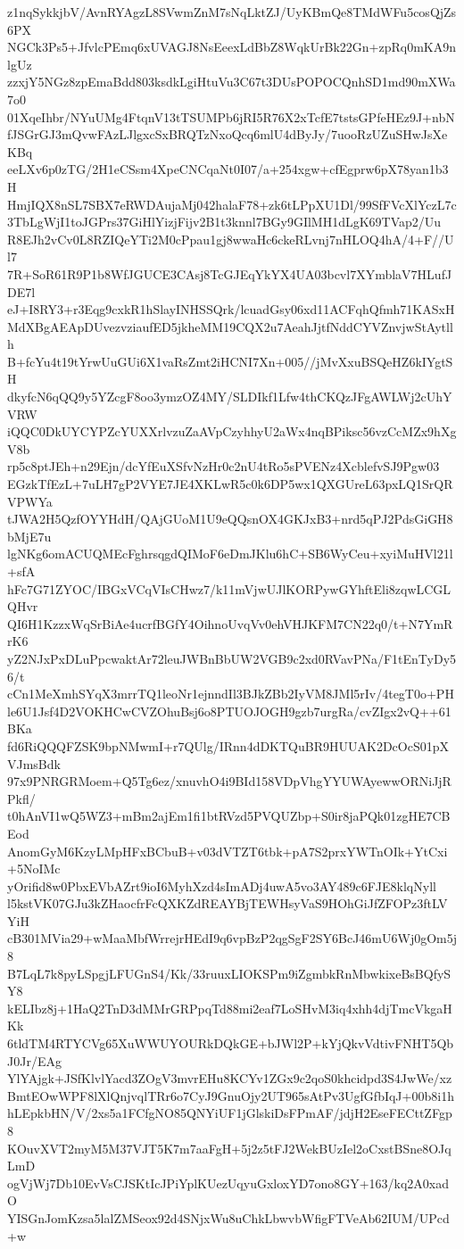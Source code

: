 z1nqSykkjbV/AvnRYAgzL8SVwmZnM7sNqLktZJ/UyKBmQe8TMdWFu5cosQjZs6PX
NGCk3Ps5+JfvlcPEmq6xUVAGJ8NsEeexLdBbZ8WqkUrBk22Gn+zpRq0mKA9nlgUz
zzxjY5NGz8zpEmaBdd803ksdkLgiHtuVu3C67t3DUsPOPOCQnhSD1md90mXWa7o0
01XqeIhbr/NYuUMg4FtqnV13tTSUMPb6jRI5R76X2xTcfE7tstsGPfeHEz9J+nbN
fJSGrGJ3mQvwFAzLJlgxcSxBRQTzNxoQcq6mlU4dByJy/7uooRzUZuSHwJsXeKBq
eeLXv6p0zTG/2H1eCSsm4XpeCNCqaNt0I07/a+254xgw+cfEgprw6pX78yan1b3H
HmjIQX8nSL7SBX7eRWDAujaMj042halaF78+zk6tLPpXU1Dl/99SfFVcXlYczL7c
3TbLgWjI1toJGPrs37GiHlYizjFijv2B1t3knnl7BGy9GIlMH1dLgK69TVap2/Uu
R8EJh2vCv0L8RZIQeYTi2M0cPpau1gj8wwaHc6ckeRLvnj7nHLOQ4hA/4+F//Ul7
7R+SoR61R9P1b8WfJGUCE3CAsj8TcGJEqYkYX4UA03bcvl7XYmblaV7HLufJDE7l
eJ+I8RY3+r3Eqg9cxkR1hSlayINHSSQrk/lcuadGsy06xd11ACFqhQfmh71KASxH
MdXBgAEApDUvezvziaufED5jkheMM19CQX2u7AeahJjtfNddCYVZnvjwStAytllh
B+fcYu4t19tYrwUuGUi6X1vaRsZmt2iHCNI7Xn+005//jMvXxuBSQeHZ6kIYgtSH
dkyfcN6qQQ9y5YZcgF8oo3ymzOZ4MY/SLDIkf1Lfw4thCKQzJFgAWLWj2cUhYVRW
iQQC0DkUYCYPZcYUXXrlvzuZaAVpCzyhhyU2aWx4nqBPiksc56vzCcMZx9hXgV8b
rp5c8ptJEh+n29Ejn/dcYfEuXSfvNzHr0c2nU4tRo5sPVENz4XcblefvSJ9Pgw03
EGzkTfEzL+7uLH7gP2VYE7JE4XKLwR5c0k6DP5wx1QXGUreL63pxLQ1SrQRVPWYa
tJWA2H5QzfOYYHdH/QAjGUoM1U9eQQsnOX4GKJxB3+nrd5qPJ2PdsGiGH8bMjE7u
lgNKg6omACUQMEcFghrsqgdQIMoF6eDmJKlu6hC+SB6WyCeu+xyiMuHVl21l+sfA
hFc7G71ZYOC/IBGxVCqVIsCHwz7/k11mVjwUJlKORPywGYhftEli8zqwLCGLQHvr
QI6H1KzzxWqSrBiAe4ucrfBGfY4OihnoUvqVv0ehVHJKFM7CN22q0/t+N7YmRrK6
yZ2NJxPxDLuPpcwaktAr72leuJWBnBbUW2VGB9c2xd0RVavPNa/F1tEnTyDy56/t
cCn1MeXmhSYqX3mrrTQ1leoNr1ejnndIl3BJkZBb2IyVM8JMl5rIv/4tegT0o+PH
le6U1Jsf4D2VOKHCwCVZOhuBsj6o8PTUOJOGH9gzb7urgRa/cvZIgx2vQ++61BKa
fd6RiQQQFZSK9bpNMwmI+r7QUlg/IRnn4dDKTQuBR9HUUAK2DcOcS01pXVJmsBdk
97x9PNRGRMoem+Q5Tg6ez/xnuvhO4i9BId158VDpVhgYYUWAyewwORNiJjRPkfl/
t0hAnVI1wQ5WZ3+mBm2ajEm1fi1btRVzd5PVQUZbp+S0ir8jaPQk01zgHE7CBEod
AnomGyM6KzyLMpHFxBCbuB+v03dVTZT6tbk+pA7S2prxYWTnOIk+YtCxi+5NoIMc
yOrifid8w0PbxEVbAZrt9ioI6MyhXzd4sImADj4uwA5vo3AY489c6FJE8klqNyll
l5kstVK07GJu3kZHaocfrFcQXKZdREAYBjTEWHsyVaS9HOhGiJfZFOPz3ftLVYiH
cB301MVia29+wMaaMbfWrrejrHEdI9q6vpBzP2qgSgF2SY6BcJ46mU6Wj0gOm5j8
B7LqL7k8pyLSpgjLFUGnS4/Kk/33ruuxLIOKSPm9iZgmbkRnMbwkixeBsBQfySY8
kELIbz8j+1HaQ2TnD3dMMrGRPpqTd88mi2eaf7LoSHvM3iq4xhh4djTmcVkgaHKk
6tldTM4RTYCVg65XuWWUYOURkDQkGE+bJWl2P+kYjQkvVdtivFNHT5QbJ0Jr/EAg
YlYAjgk+JSfKlvlYacd3ZOgV3mvrEHu8KCYv1ZGx9c2qoS0khcidpd3S4JwWe/xz
BmtEOwWPF8lXlQnjvqlTRr6o7CyJ9GnuOjy2UT965sAtPv3UgfGfbIqJ+00b8i1h
hLEpkbHN/V/2xs5a1FCfgNO85QNYiUF1jGlskiDsFPmAF/jdjH2EseFECttZFgp8
KOuvXVT2myM5M37VJT5K7m7aaFgH+5j2z5tFJ2WekBUzIel2oCxstBSne8OJqLmD
ogVjWj7Db10EvVsCJSKtIcJPiYplKUezUqyuGxloxYD7ono8GY+163/kq2A0xadO
YISGnJomKzsa5lalZMSeox92d4SNjxWu8uChkLbwvbWfigFTVeAb62IUM/UPcd+w
